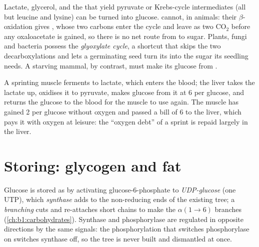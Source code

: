 \begin{proposition}\label{prop:b1:biosyntheses-integration:cannot}
Lactate, glycerol, and the  that yield pyruvate or
Krebs-cycle intermediates (all but leucine and lysine) can be turned
into glucose.  cannot, in animals: their $\beta$-oxidation
gives , whose two carbons enter the cycle and leave as two
$\mathrm{CO_2}$ before any oxaloacetate is gained, so there is no net
route from  to sugar. Plants, fungi and bacteria possess the
\emph{glyoxylate cycle}, a shortcut that skips the two decarboxylations
and lets a germinating  seed turn its  into the sugar its
seedling needs. A starving mammal, by contrast, must make its glucose
from .
\end{proposition}

\begin{example}\label{ex:b1:biosyntheses-integration:cori}
A sprinting muscle ferments  to lactate, which enters the
blood; the liver takes the lactate up, oxidises it to pyruvate, makes
glucose from it at 6  per glucose, and returns the glucose to the
blood for the muscle to use again. The muscle has gained 2  per
glucose without oxygen and passed a bill of 6 to the liver, which
pays it with oxygen at leisure: the ``oxygen debt'' of a sprint is
repaid largely in the liver.
\end{example}

\section{Storing: glycogen and fat}

\begin{definition}\label{def:b1:biosyntheses-integration:glycogensynthesis}
Glucose is stored as  by activating glucose-6-phosphate to
\emph{UDP-glucose} (one UTP), which \emph{ synthase} adds to
the non-reducing ends of the existing tree; a \emph{branching }
cuts and re-attaches short chains to make the $\alpha(1{\to}6)$
branches (\cref{ch:b1:carbohydrates}). Synthase and phosphorylase are
regulated in opposite directions by the same signals: the
phosphorylation that switches phosphorylase on switches synthase off,
so the tree is never built and dismantled at once.
\end{definition}

